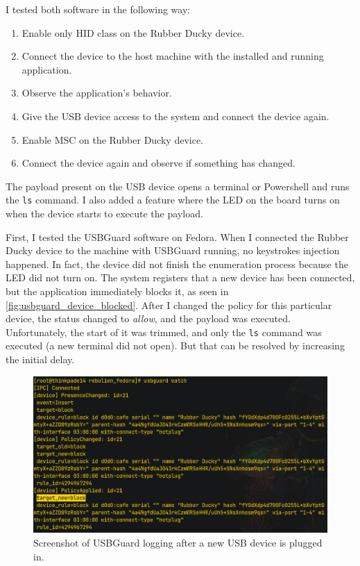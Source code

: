 I tested both software in the following way:
\begin{enumerate}
    \item Enable only HID class on the Rubber Ducky device.
    \item Connect the device to the host machine with the installed and running application.
    \item Observe the application's behavior.
    \item Give the USB device access to the system and connect the device again.
    \item Enable MSC on the Rubber Ducky device.
    \item Connect the device again and observe if something has changed.
\end{enumerate}
The payload present on the USB device opens a terminal or Powershell and runs the \verb|ls| command. I also added a feature where the LED on the board turns on when the device starts to execute the payload.

First, I tested the USBGuard software on Fedora. When I connected the Rubber Ducky device to the machine with USBGuard running, no keystrokes injection happened. In fact, the device did not finish the enumeration process because the LED did not turn on. The system registers that a new device has been connected, but the application immediately blocks it, as seen in \autoref{fig:usbguard_device_blocked}. After I changed the policy for this particular device, the status changed to \emph{allow}, and the payload was executed. Unfortunately, the start of it was trimmed, and only the \verb|ls| command was executed (a new terminal did not open). But that can be resolved by increasing the initial delay.

\begin{figure}[ht]
    \centering
    \includegraphics[width=\linewidth]{./obrazky-figures/usbguard_watch.png}
    \caption{Screenshot of USBGuard logging after a new USB device is plugged in.}
    \label{fig:usbguard_device_blocked}
\end{figure}

